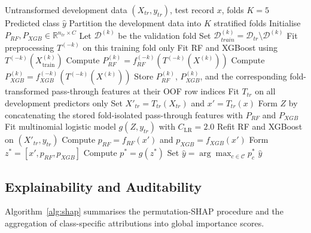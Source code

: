 \documentclass[a4paper,fleqn]{cas-dc}
\begin{document}
\begin{algorithm}[!t]
\caption{Fold-Isolated RF--XGBoost Stacking Protocol}
\label{alg:stack}
\small
\begin{algorithmic}[1]
\Require Untransformed development data $(X_{tr},y_{tr})$, test record $x$, folds $K=5$
\Ensure Predicted class $\hat y$
\State Partition the development data into $K$ stratified folds
\State Initialise $P_{RF},P_{XGB}\in\mathbb{R}^{n_{tr}\times C}$
  \State Let $\mathcal{D}^{(k)}$ be the validation fold
  \State Set $\mathcal{D}_{train}^{(k)}=\mathcal{D}_{tr}\setminus\mathcal{D}^{(k)}$
  \State Fit preprocessing $T^{(-k)}$ on this training fold only
  \State Fit RF and XGBoost using $T^{(-k)}(X_{\mathrm{train}}^{(k)})$
  \State Compute $P_{RF}^{(k)}=f_{RF}^{(-k)}(T^{(-k)}(X^{(k)}))$
  \State Compute $P_{XGB}^{(k)}=f_{XGB}^{(-k)}(T^{(-k)}(X^{(k)}))$
  \State Store $P_{RF}^{(k)}$, $P_{XGB}^{(k)}$, and the corresponding
  fold-transformed pass-through features at their OOF row indices
\EndFor
\State Fit $T_{tr}$ on all development predictors only
\State Set $X'_{tr}=T_{tr}(X_{tr})$ and $x'=T_{tr}(x)$
\State Form $Z$ by concatenating the stored fold-isolated
  pass-through features with $P_{RF}$ and $P_{XGB}$
\State Fit multinomial logistic model $g(Z,y_{tr})$ with $C_{\mathrm{LR}}=2.0$
\State Refit RF and XGBoost on $(X'_{tr},y_{tr})$
\State Compute $p_{RF}=f_{RF}(x')$ and $p_{XGB}=f_{XGB}(x')$
\State Form $z^*=[x',p_{RF},p_{XGB}]$
\State Compute $p^*=g(z^*)$
\State Set $\hat y=\arg\max_{c\in\mathcal{C}}p_c^*$
\State \Return $\hat y$
\end{algorithmic}
\end{algorithm}

\subsection{Explainability and Auditability}
\label{sec:explain}
Algorithm~\ref{alg:shap} summarises the permutation-SHAP procedure and the aggregation of class-specific attributions into global importance scores.
\end{document}
